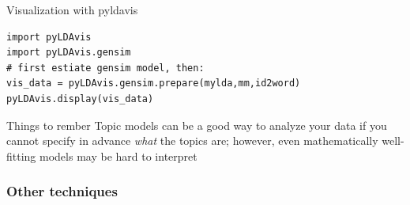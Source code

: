\documentclass{beamer}
\begin{document}
\begin{frame}[plain]
\end{frame}




\begin{frame}[fragile]{Visualization with pyldavis}
\begin{lstlisting}
import pyLDAvis
import pyLDAvis.gensim
# first estiate gensim model, then:
vis_data = pyLDAvis.gensim.prepare(mylda,mm,id2word)
pyLDAvis.display(vis_data)
\end{lstlisting}
\end{frame}




\begin{frame}[plain]
	\begin{alertblock}{Things to rember}
Topic models can be a good way to analyze your data if you cannot specify in advance \textit{what} the topics are; however, even mathematically well-fitting models may be hard to interpret
	\end{alertblock}

\end{frame}




\subsubsection{Other techniques}
\end{document}
